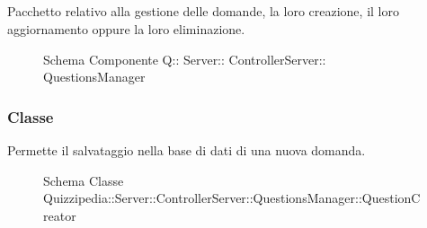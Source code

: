 \subsection{}
Pacchetto relativo alla gestione delle domande, la loro creazione, il loro aggiornamento oppure la loro eliminazione.
\begin{figure}[H]
\centering
\noindent{}
\caption[Schema Componente Quizzipedia::Server::ControllerServer::QuestionsManager]{Schema Componente Q:: Server:: ControllerServer:: QuestionsManager}
\end{figure}
\subsubsection{Classe }
Permette il salvataggio nella base di dati di una nuova domanda.
\begin{figure}[H]
\centering
\noindent{}
\caption[Schema Classe QuestionCreator]{Schema Classe Quizzipedia::Server::ControllerServer::QuestionsManager::QuestionCreator}
\end{figure}

